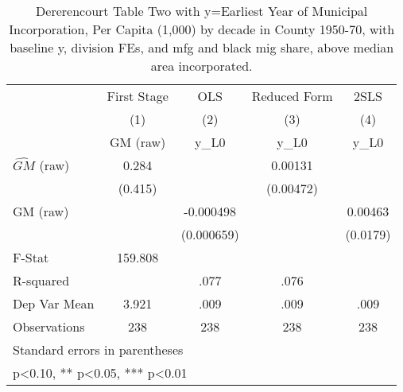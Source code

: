 \begin{table}[htbp]\centering
\def\sym#1{\ifmmode^{#1}\else\(^{#1}\)\fi}
\caption{Dererencourt Table Two with y=Earliest Year of Municipal Incorporation, Per Capita (1,000) by decade in County 1950-70, with baseline y, division FEs, and mfg and black mig share, above median area incorporated.}
\begin{tabular}{l*{4}{c}}
\toprule
                    & First Stage   &         OLS   &Reduced Form   &        2SLS   \\
                    &\multicolumn{1}{c}{(1)}&\multicolumn{1}{c}{(2)}&\multicolumn{1}{c}{(3)}&\multicolumn{1}{c}{(4)}\\
                    &\multicolumn{1}{c}{GM  (raw)}&\multicolumn{1}{c}{y\_L0}&\multicolumn{1}{c}{y\_L0}&\multicolumn{1}{c}{y\_L0}\\
\midrule
$\hat{GM}$ (raw)    &       0.284   &               &     0.00131   &               \\
                    &     (0.415)   &               &   (0.00472)   &               \\
\addlinespace
GM  (raw)           &               &   -0.000498   &               &     0.00463   \\
                    &               &  (0.000659)   &               &    (0.0179)   \\
\midrule
F-Stat              &     159.808   &               &               &               \\
R-squared           &               &        .077   &        .076   &               \\
Dep Var Mean        &       3.921   &        .009   &        .009   &        .009   \\
Observations        &         238   &         238   &         238   &         238   \\
\bottomrule
\multicolumn{5}{l}{\footnotesize Standard errors in parentheses}\\
\multicolumn{5}{l}{\footnotesize * p<0.10, ** p<0.05, *** p<0.01}\\
\end{tabular}
\end{table}
